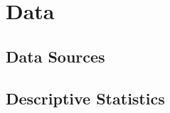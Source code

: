 \section{Data}\label{sec:data}

\subsection{Data Sources}\label{sec:data_sources}

\subsection{Descriptive Statistics}\label{sec:descriptives}

